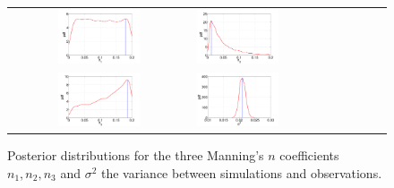  \begin{figure}[ht]
        \begin{tabular}{clc}
\includegraphics[width=0.475\textwidth]{./figures/pdf_p1.pdf} &
\includegraphics[width=0.475\textwidth]{./figures/pdf_p2.pdf} \\
\includegraphics[width=0.475\textwidth]{./figures/pdf_p3.pdf} &
\includegraphics[width=0.475\textwidth]{./figures/pdf_s1.pdf}
        \end{tabular}
        \caption{Posterior distributions for the three Manning's $n$ coefficients $n_1,n_2,n_3$ 
and $\sigma^2$ the variance between simulations and observations.}
\label{fig:pdfs} 
        \end{figure}
